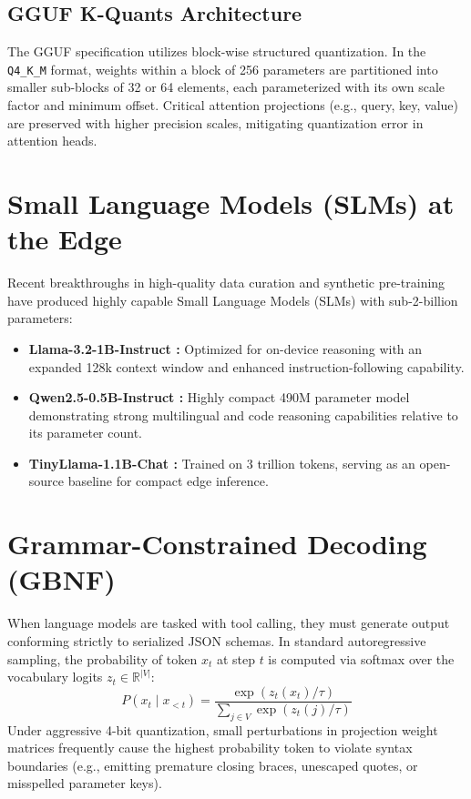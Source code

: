 \documentclass[12pt,a4paper,oneside]{report}
\begin{document}
\subsection{GGUF K-Quants Architecture}
The GGUF specification utilizes block-wise structured quantization. In the \texttt{Q4\_K\_M} format, weights within a block of 256 parameters are partitioned into smaller sub-blocks of 32 or 64 elements, each parameterized with its own scale factor and minimum offset. Critical attention projections (e.g., query, key, value) are preserved with higher precision scales, mitigating quantization error in attention heads.

\section{Small Language Models (SLMs) at the Edge}
Recent breakthroughs in high-quality data curation and synthetic pre-training have produced highly capable Small Language Models (SLMs) with sub-2-billion parameters:
\begin{itemize}
    \item \textbf{Llama-3.2-1B-Instruct \cite{dubey2024llama3}:} Optimized for on-device reasoning with an expanded 128k context window and enhanced instruction-following capability.
    \item \textbf{Qwen2.5-0.5B-Instruct \cite{yang2024qwen2}:} Highly compact 490M parameter model demonstrating strong multilingual and code reasoning capabilities relative to its parameter count.
    \item \textbf{TinyLlama-1.1B-Chat \cite{zhang2024tinyllama}:} Trained on 3 trillion tokens, serving as an open-source baseline for compact edge inference.
\end{itemize}

\section{Grammar-Constrained Decoding (GBNF)}
When language models are tasked with tool calling, they must generate output conforming strictly to serialized JSON schemas. In standard autoregressive sampling, the probability of token $x_t$ at step $t$ is computed via softmax over the vocabulary logits $z_t \in \mathbb{R}^{|V|}$:
\begin{equation}
    P(x_t \mid x_{<t}) = \frac{\exp(z_t(x_t) / \tau)}{\sum_{j \in V} \exp(z_t(j) / \tau)}
\end{equation}
Under aggressive 4-bit quantization, small perturbations in projection weight matrices frequently cause the highest probability token to violate syntax boundaries (e.g., emitting premature closing braces, unescaped quotes, or misspelled parameter keys).
\end{document}
